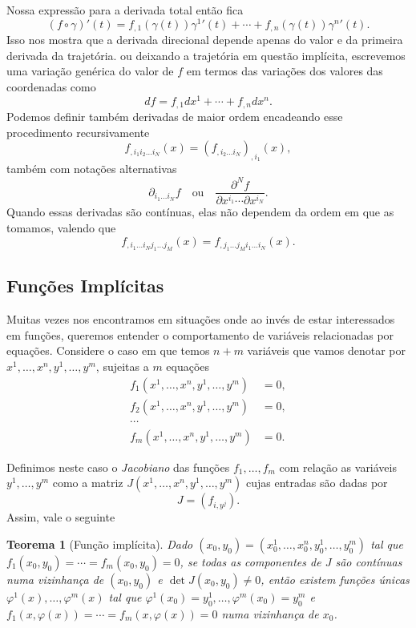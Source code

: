 \documentclass[a4paper, 12pt]{article}
\newtheorem{theorem}{Teorema}[section]
\theoremstyle{definition}
\theoremstyle{definition}
\begin{document}
Nossa expressão para a derivada total então fica
$$(f\circ\gamma)'(t)=f_{,1}(\gamma(t))\gamma^{1}{'}(t)+\cdots+f_{,n}(\gamma(t))\gamma^{n}{'}(t).$$
Isso nos mostra que a derivada direcional depende apenas do valor e da primeira derivada da trajetória.
ou deixando a trajetória em questão implícita, escrevemos uma variação genérica do valor de $f$ em termos
das variações dos valores das coordenadas como
$$df=f_{,1}dx^1+\cdots+f_{,n}dx^n.$$
Podemos definir também derivadas de maior ordem encadeando esse procedimento recursivamente
$$f_{,i_1i_2\dots i_N}(x)=(f_{,i_2\dots i_N})_{,i_1}(x),$$
também com notações alternativas
$$\partial_{i_1\dots i_N} f\quad\text{ou}\quad\frac{\partial^N f}{\partial x^{i_1}\cdots\partial x^{i_N}}.$$
Quando essas derivadas são contínuas, elas não dependem da ordem em que as tomamos, valendo que
$$f_{,i_1\dots i_Nj_1\dots j_M}(x)=f_{,j_1\dots j_Mi_1\dots i_N}(x).$$

\subsection{Funções Implícitas}

Muitas vezes nos encontramos em situações onde ao invés de estar interessados em funções, queremos entender
o comportamento de variáveis relacionadas por equações. Considere o caso em que temos $n+m$ variáveis
que vamos denotar por $x^1,\dots,x^n,y^1,\dots,y^m$, sujeitas a $m$ equações
\begin{align*}
    f_1(x^1,\dots,x^n,y^1,\dots,y^m)&=0,\\
    f_2(x^1,\dots,x^n,y^1,\dots,y^m)&=0,\\
    \cdots&\\
    f_m(x^1,\dots,x^n,y^1,\dots,y^m)&=0.
\end{align*}

Definimos neste caso o \textit{Jacobiano} das funções $f_1,\dots,f_m$ com relação as variáveis $y^1,\dots,y^m$
como a matriz $J(x^1,\dots,x^n,y^1,\dots,y^m)$ cujas entradas são dadas por
$$J=\left(f_{i,y^j}\right).$$
Assim, vale o seguinte 
\begin{theorem}[Função implícita]
    Dado $(x_0,y_0)=(x^1_0,\dots,x^n_0,y^1_0,\dots,y^m_0)$ tal que $f_1(x_0,y_0)=\cdots=f_m(x_0,y_0)=0$,
    se todas as componentes de $J$ são contínuas numa vizinhança de $(x_0,y_0)$ e $\det J(x_0,y_0)\neq0$,
    então existem funções únicas $\varphi^1(x),\dots,\varphi^m(x)$ tal que $\varphi^1(x_0)=y^1_0,\dots,
    \varphi^m(x_0)=y^m_0$ e $f_1(x,\varphi(x))=\cdots=f_m(x,\varphi(x))=0$ numa vizinhança de $x_0$.
\end{theorem}
\end{document}
